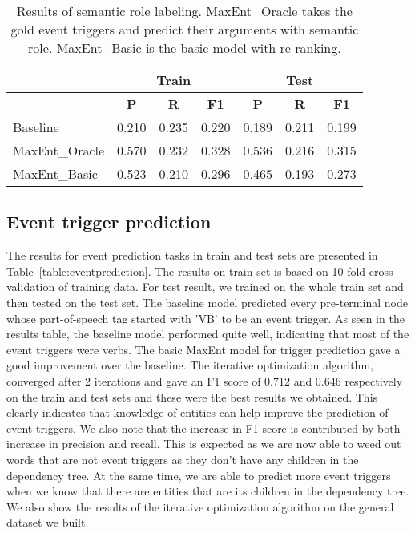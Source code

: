 \begin{table*}[ht]
\centering
\begin{tabular}{|l||c|c|c||c|c|c||} \hline
& \multicolumn{3}{|c||}{\textbf{Train}} & \multicolumn{3}{|c||}{\textbf{Test}}\\ \hline
&\textbf{P} & \textbf{R} & \textbf{F1} &\textbf{P} & \textbf{R} & \textbf{F1}\\ \hline
Baseline& 0.210 & 0.235 &0.220&0.189 & 0.211 &0.199\\
MaxEnt\_Oracle& 0.570 & 0.232 &0.328&0.536 & 0.216 &0.315\\
MaxEnt\_Basic& 0.523 & 0.210 &0.296&0.465 & 0.193 &0.273\\
\hline
\end{tabular}
\caption{Results of semantic role labeling. MaxEnt\_Oracle takes the gold event triggers and predict their arguments with semantic role. MaxEnt\_Basic is the basic model with re-ranking.}
\label{table:srlprediction}
\end{table*}

\subsection{Event trigger prediction}
The results for event prediction tasks in train and test sets are presented in Table~\ref{table:eventprediction}. The results on train set is based on 10 fold cross validation of training data. For test result, we trained on the whole train set and then tested on the test set. The baseline model predicted every pre-terminal node whose part-of-speech tag started with 'VB' to be an event trigger. As seen in the results table, the baseline model performed quite well, indicating that most of the event triggers were verbs. The basic MaxEnt model for trigger prediction gave a good improvement over the baseline. The iterative optimization algorithm, converged after 2 iterations and gave an F1 score of 0.712 and 0.646 respectively on the train and test sets and these were the best results we obtained. This clearly indicates that knowledge of entities can help improve the prediction of event triggers. We also note that the increase in F1 score is contributed by both increase in precision and recall. This is expected as we are now able to weed out words that are not event triggers as they don't have any children in the dependency tree. At the same time, we are able to predict more event triggers when we know that there are entities that are its children in the dependency tree. We also show the results of the iterative optimization algorithm on the general dataset we built.

